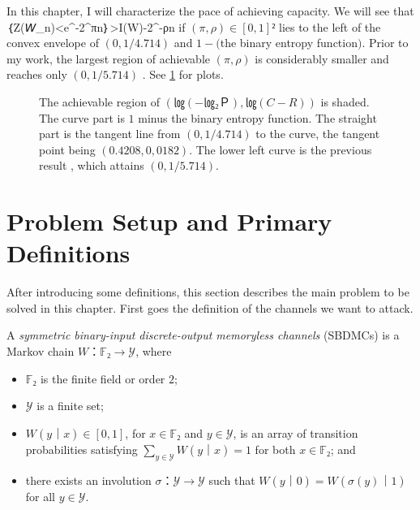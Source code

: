 \documentclass[openany]{amsbook}
\numberwithin{equation}{chapter}
\numberwithin{figure}{chapter}
\numberwithin{table}{chapter}
\def\[#1\]{\begin{equation*}{#1}\end{equation*}}
\theoremstyle{definition}	理dfn:Definition~?s			理exa:Example~?s
\theoremstyle{remark}		理cla:Claim~?s				理rem:Remark~?s
\begin{document}
	In this chapter, I will characterize the pace of achieving capacity.
	We will see that
	\[𝘗｛Z(𝘞_n)<e^{-2^{πn}}｝>I(W)-2^{-ρn}\]
	if $(π,ρ)∈[0,1]²$ lies to the left of the convex envelope of
	$(0,1/4.714)$ and $1-($the binary entropy function$)$.
	Prior to my work, the largest region of achievable $(π,ρ)$
	is considerably smaller and reaches only $(0,1/5.714)$ \cite{MHU16}.
	See \cref{fig:lol-bdmc} for plots.
	
	\begin{figure}
		\caption{
			The achievable region of $(㏒(-㏒₂Ｐ),㏒(C-R))$ is shaded.
			The curve part is $1$ minus the binary entropy function.
			The straight part is the tangent line from $(0,1/4.714)$ to the curve,
			the tangent point being $(0.4208,0,0182)$.
			The lower left curve is the previous result \cite{MHU16},
			which attains $(0,1/5.714)$.
		}\label{fig:lol-bdmc}
	\end{figure}

\section{Problem Setup and Primary Definitions}

	After introducing some definitions,
	this section describes the main problem to be solved in this chapter.
	First goes the definition of the channels we want to attack.
	
	\begin{dfn}
		A \emph{symmetric binary-input discrete-output memoryless channels} (SBDMCs)
		is a Markov chain $W：𝔽₂→𝒴$, where
		\begin{itemize}
			\item	$𝔽₂$ is the finite field or order $2$;
			\item	$𝒴$ is a finite set;
			\item	$W(y｜x)∈[0,1]$, for $x∈𝔽₂$ and $y∈𝒴$, is an array of transition	\\
					probabilities satisfying $∑_{y∈𝒴}W(y｜x)=1$ for both $x∈𝔽₂$; and
			\item	there exists an involution $σ：𝒴→𝒴$
					such that $W(y｜0)=W(σ(y)｜1)$ for all $y∈𝒴$.
		\end{itemize}
	\end{dfn}
	
\end{document}

